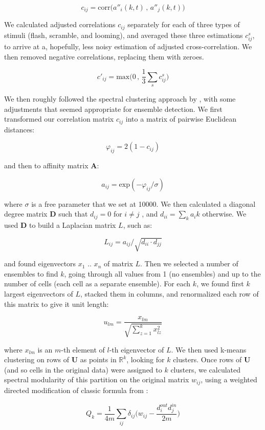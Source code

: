 \documentclass{article}
\begin{document}
\[ c_{ij} = \text{corr}\big(a''_i(k,t)\, , \, a''_j(k,t)\big) \]

We calculated adjusted correlations $c_{ij}$ separately for each of three types of stimuli (flash, scramble, and looming), and averaged these three estimations $c_{ij}^s$, to arrive at a, hopefully, less noisy estimation of adjusted cross-correlation. We then removed negative correlations, replacing them with zeroes.

\[ c'_{ij} = \text{max}\big(0 \, , \, \frac{1}{3} \sum_{s}{c_{ij}^s}\big) \]

We then roughly followed the spectral clustering approach by \citep{ng2002spectral}, with some adjustments that seemed appropriate for ensemble detection. We first transformed our correlation matrix $c_{ij}$ into a matrix of pairwise Euclidean distances:

\[ \varphi_{ij} = 2(1-c_{ij}) \]

and then to affinity matrix $\textbf{A}$:

\[ a_{ij} = \text{exp}(-\varphi_{ij}/\sigma) \]

where $\sigma$ is a free parameter that we set at 10000. We then calculated a diagonal degree matrix $\textbf{D}$ such that $d_{ij} = 0$ for $i \neq j$ , and $d_{ii} = \sum_k{a_ik}$ otherwise. We used $\textbf{D}$ to build a Laplacian matrix $L$, such as:

\[ L_{ij} = a_{ij}/\sqrt{d_{ii}\cdot d_{jj}} \]

and found eigenvectors $x_1$ .. $x_n$ of matrix $L$. Then we selected a number of ensembles to find $k$, going through all values from 1 (no ensembles) and up to the number of cells (each cell as a separate ensemble). For each $k$, we found first $k$ largest eigenvectors of $L$, stacked them in columns, and renormalized each row of this matrix to give it unit length:

\[ u_{lm} = \frac{x_{lm}}{\sqrt{\sum_{z=1}^{k}{x_{lz}^2}}} \]

where $x_{lm}$ is an $m$-th element of $l$-th eigenvector of $L$. We then used k-means clustering on rows of $\textbf{U}$ as points in $\mathbb{R}^k$, looking for $k$ clusters. Once rows of $\textbf{U}$ (and so cells in the original data) were assigned to $k$ clusters, we calculated spectral modularity of this partition on the original matrix $w_{ij}$, using a weighted directed modification of classic formula from \citep{newman2006modularity}:

\[ Q_k = \frac{1}{4m}\sum_{ij}{\delta_{ij}\Big(w_{ij}-\frac{d^{out}_i d^{in}_j}{2m}}\Big) \]
\end{document}
